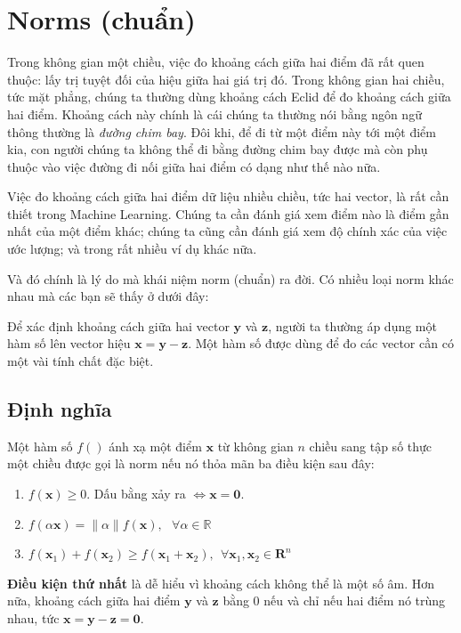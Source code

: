 \documentclass[12pt]{article}
\begin{document}
 
\section{Norms (chuẩn)}
Trong không gian một chiều, việc đo khoảng cách giữa hai điểm đã rất quen thuộc: lấy trị tuyệt đối của hiệu giữa hai giá trị đó. Trong không gian hai chiều, tức mặt phẳng, chúng ta thường dùng khoảng cách Eclid để đo khoảng cách giữa hai điểm. Khoảng cách này chính là cái chúng ta thường nói bằng ngôn ngữ thông thường là \textit{đường chim bay}. Đôi khi, để đi từ một điểm này tới một điểm kia, con người chúng ta không thể đi bằng đường chim bay được mà còn phụ thuộc vào việc đường đi nối giữa hai điểm có dạng như thế nào nữa.  
 
Việc đo khoảng cách giữa hai điểm dữ liệu nhiều chiều, tức hai vector, là rất cần thiết trong Machine Learning. Chúng ta cần đánh giá xem điểm nào là điểm gần nhất của một điểm khác; chúng ta cũng cần đánh giá xem độ chính xác của việc ước lượng; và trong rất nhiều ví dụ khác nữa.  
 
Và đó chính là lý do mà khái niệm norm (chuẩn) ra đời. Có nhiều loại norm khác nhau mà các bạn sẽ thấy ở dưới đây:  
 
Để xác định khoảng cách giữa hai vector $\mathbf{y}$ và $\mathbf{z}$, người ta thường áp dụng một hàm số lên vector hiệu $\mathbf{x = y - z}$. Một hàm số được dùng để đo các vector cần có một vài tính chất đặc biệt.  
 
\subsection{Định nghĩa}
Một hàm số $f() $ ánh xạ một điểm $\mathbf{x}$ từ không gian $n$ chiều sang tập số thực một chiều được gọi là norm nếu nó thỏa mãn ba điều kiện sau đây: 
 
\begin{enumerate}

	\item $f(\mathbf{x}) \geq 0$. Dấu bằng xảy ra $\Leftrightarrow \mathbf{x = 0} $.

	\item $f(\alpha \mathbf{x}) = \|\alpha\| f(\mathbf{x}), ~~~\forall \alpha \in \mathbb{R}\ $

	\item $f(\mathbf{x}_1) + f(\mathbf{x}_2) \geq f(\mathbf{x}_1 + \mathbf{x}_2), ~~\forall \mathbf{x}_1, \mathbf{x}_2 \in \mathbf{R}^n$
\end{enumerate}
 
\textbf{Điều kiện thứ nhất} là dễ hiểu vì khoảng cách không thể là một số âm. Hơn nữa, khoảng cách giữa hai điểm $\mathbf{y}$ và $\mathbf{z}$ bằng 0 nếu và chỉ nếu hai điểm nó trùng nhau, tức $\mathbf{x = y - z = 0} $. 
 
\end{document}
